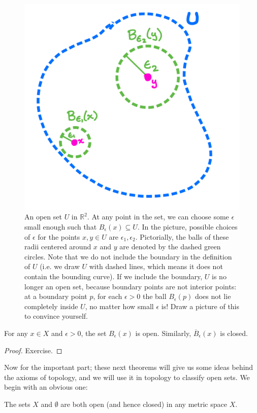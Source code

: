 	\begin{figure}[H]
		\centering
		\includegraphics[width = .55\textwidth]{open_set}
		\caption{An open set $U$ in $\mathbb R^2$. At any point in the set, we can choose some $\epsilon$ small enough such that $B_\epsilon(x)\subseteq U$. In the picture, possible choices of $\epsilon$ for the points $x, y\in U$ are $\epsilon_1, \epsilon_2$. Pictorially, the balls of these radii centered around $x$ and $y$ are denoted by the dashed green circles. Note that we do not include the boundary in the definition of $U$ (i.e. we draw $U$ with dashed lines, which means it does not contain the bounding curve). If we include the boundary, $U$ is no longer an open set, because boundary points are not interior points: at a boundary point $p$, for each $\epsilon > 0$ the ball $B_\epsilon(p)$ does not lie completely inside $U$, no matter how small $\epsilon$ is! Draw a picture of this to convince yourself.}
		\label{fig:open_set}
	\end{figure}
	
	\begin{theorem}
	For any $x\in X$ and $\epsilon > 0$, the set $B_\epsilon(x)$ is open. Similarly, $\overline B_\epsilon(x)$ is closed.
	\end{theorem}
	
	\begin{proof} Exercise. \end{proof}
	
	Now for the important part; these next theorems will give us some ideas behind the axioms of topology, and we will use it in topology to classify open sets. 
	We begin with an obvious one:
	
	\begin{theorem}
		The sets $X$ and $\emptyset$ are both open (and hence closed) in any metric space $X$.
	\end{theorem}
	
